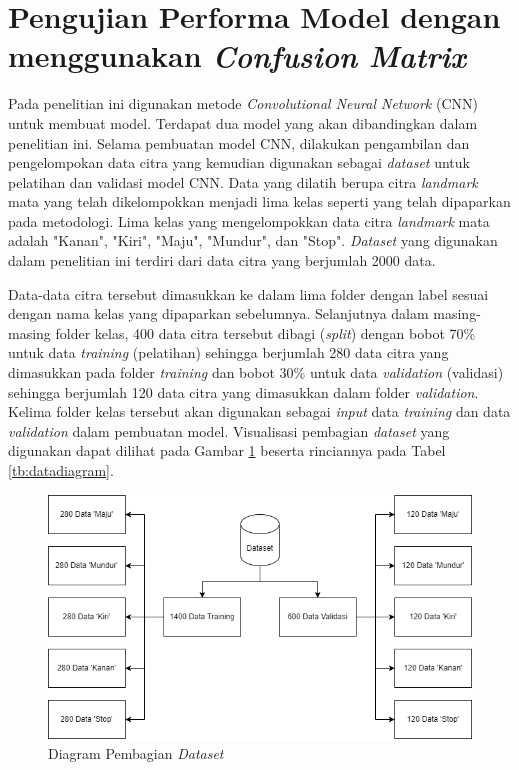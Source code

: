 \section{Pengujian Performa Model dengan menggunakan \emph{Confusion Matrix}}

Pada penelitian ini digunakan metode \emph{Convolutional Neural Network} (CNN) untuk membuat model. Terdapat dua model yang akan dibandingkan dalam penelitian ini. Selama pembuatan model CNN, dilakukan pengambilan dan pengelompokan data citra yang kemudian digunakan sebagai \emph{dataset} untuk pelatihan dan validasi model CNN. Data yang dilatih berupa citra \emph{landmark} mata yang telah dikelompokkan menjadi lima kelas seperti yang telah dipaparkan pada metodologi. Lima kelas yang mengelompokkan data citra \emph{landmark} mata adalah "Kanan", "Kiri", "Maju", "Mundur", dan "Stop". \emph{Dataset} yang digunakan dalam penelitian ini terdiri dari data citra yang berjumlah 2000 data. 

Data-data citra tersebut dimasukkan ke dalam lima folder dengan label sesuai dengan nama kelas yang dipaparkan sebelumnya. Selanjutnya dalam masing-masing folder kelas, 400 data citra tersebut dibagi (\emph{split}) dengan bobot 70\% untuk data \emph{training} (pelatihan) sehingga berjumlah 280 data citra yang dimasukkan pada folder \emph{training }dan bobot 30\% untuk data \emph{validation} (validasi) sehingga berjumlah 120 data citra yang dimasukkan dalam folder \emph{validation}. Kelima folder kelas tersebut akan digunakan sebagai \emph{input} data \emph{training} dan data \emph{validation} dalam pembuatan model. Visualisasi pembagian \emph{dataset} yang digunakan dapat dilihat pada Gambar \ref{fig:dataset} beserta rinciannya pada Tabel \ref{tb:datadiagram}.

\begin{figure} [H] \centering
  \includegraphics[width=1\textwidth]{gambar/bab4/visualdataset.png}
  \caption{Diagram Pembagian \emph{Dataset}}
  \label{fig:dataset}
\end{figure}

